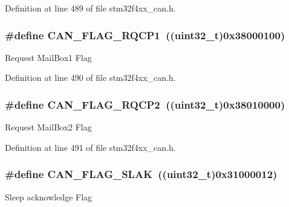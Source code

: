 Definition at line 489 of file stm32f4xx\-\_\-can.\-h.

\hypertarget{group___c_a_n__flags_gaba705586ebc3d961507436c03a2feaba}{
\subsubsection[{C\-A\-N\-\_\-\-F\-L\-A\-G\-\_\-\-R\-Q\-C\-P1}]{\setlength{\rightskip}{0pt plus 5cm}\#define C\-A\-N\-\_\-\-F\-L\-A\-G\-\_\-\-R\-Q\-C\-P1~((uint32\-\_\-t)0x38000100)}}\label{group___c_a_n__flags_gaba705586ebc3d961507436c03a2feaba}
Request Mail\-Box1 Flag 

Definition at line 490 of file stm32f4xx\-\_\-can.\-h.

\hypertarget{group___c_a_n__flags_ga9c20cd47e558135bd7ae71149583d487}{
\subsubsection[{C\-A\-N\-\_\-\-F\-L\-A\-G\-\_\-\-R\-Q\-C\-P2}]{\setlength{\rightskip}{0pt plus 5cm}\#define C\-A\-N\-\_\-\-F\-L\-A\-G\-\_\-\-R\-Q\-C\-P2~((uint32\-\_\-t)0x38010000)}}\label{group___c_a_n__flags_ga9c20cd47e558135bd7ae71149583d487}
Request Mail\-Box2 Flag 

Definition at line 491 of file stm32f4xx\-\_\-can.\-h.

\hypertarget{group___c_a_n__flags_gad087b5025a3d5ead2c32b06663821cf4}{
\subsubsection[{C\-A\-N\-\_\-\-F\-L\-A\-G\-\_\-\-S\-L\-A\-K}]{\setlength{\rightskip}{0pt plus 5cm}\#define C\-A\-N\-\_\-\-F\-L\-A\-G\-\_\-\-S\-L\-A\-K~((uint32\-\_\-t)0x31000012)}}\label{group___c_a_n__flags_gad087b5025a3d5ead2c32b06663821cf4}
Sleep acknowledge Flag 

